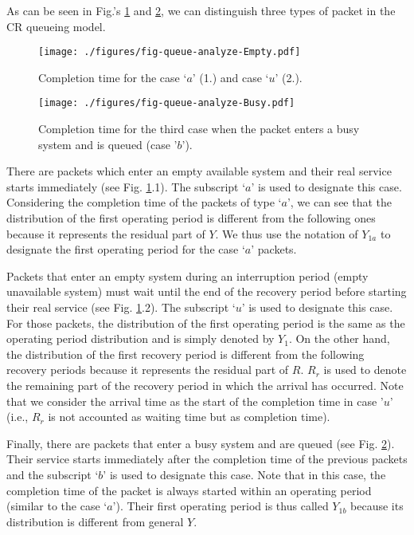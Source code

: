 \documentclass[11pt,journal,oneside,onecolumn,draftclsnofoot]{IEEEtran}
\begin{document}
As can be seen in Fig.'s \ref{fig-queue-analyze-Empty} and \ref{fig-queue-analyze-Busy},  we can distinguish three types of packet in the CR queueing model. 
\begin{figure}\texttt{[image: ./figures/fig-queue-analyze-Empty.pdf]}\caption{Completion time for the case `$a$' (1.) and  case `$u$' (2.).}\label{fig-queue-analyze-Empty}\vspace{-0.29cm}
\end{figure}
\begin{figure}\texttt{[image: ./figures/fig-queue-analyze-Busy.pdf]}\caption{Completion time for the third case when the packet enters a busy system and is queued (case '$b$').}\label{fig-queue-analyze-Busy}\end{figure}
There are packets which enter an empty available system and their real service starts immediately (see Fig. \ref{fig-queue-analyze-Empty}.1). The subscript `$a$' is used to designate this case. Considering the completion time of the packets of type `$a$', we can see that the distribution of the first operating period is different from the following ones because it represents the residual part of $Y$. We thus use the notation of $Y_{1a}$ to designate the first operating period for the case `$a$' packets. 

Packets that enter an empty system during an interruption period (empty unavailable system) must wait until the end of the recovery period before starting their real service (see Fig. \ref{fig-queue-analyze-Empty}.2). The subscript `$u$' is used to designate this case. For those packets, the distribution of the first operating period is the same as the operating period distribution and is simply denoted by $Y_{1}$. On the other hand, the distribution of the first recovery period is different from the following recovery periods because it represents the residual part of $R$. $R_{r}$ is used to denote the remaining part of the recovery period in which the arrival has occurred. Note that we consider the arrival time as the start of the completion time in  case '$u$' (i.e., $R_{r}$ is not accounted as waiting time but as completion time). 

Finally, there are packets that enter a busy system and are queued (see Fig. \ref{fig-queue-analyze-Busy}). Their service starts immediately after the completion time of the previous packets and the subscript `$b$' is used to designate this case. Note that in this case, the completion time of the packet is always started within an operating period (similar to the case `$a$'). Their first operating period is thus called $Y_{1b}$ because its distribution is different from general $Y$.
\end{document}
